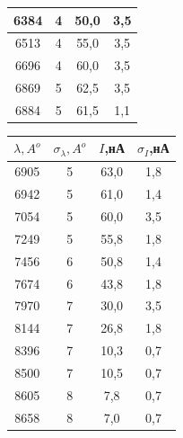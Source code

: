 \documentclass[a4paper,12pt]{report}
\begin{document}
\begin{table}[H]
\begin{center}
\begin{tabular}{|c|c|c|c|}
6384      & 4               & 50,0                        & 3,5                              \\ \hline
6513      & 4               & 55,0                        & 3,5                              \\ \hline
6696      & 4               & 60,0                        & 3,5                              \\ \hline
6869      & 5               & 62,5                        & 3,5                              \\ \hline
6884      & 5               & 61,5                        & 1,1                              \\ \hline
\end{tabular}
\hspace{1 cm}
\begin{tabular}{|c|c|c|c|}
\hline
$\lambda, A^{o}$ & $\sigma_{\lambda}, A^{o}$ & $I$,нА & $\sigma_{I}$,нА \\ \hline
6905      & 5               & 63,0                        & 1,8                              \\ \hline
6942      & 5               & 61,0                        & 1,4                              \\ \hline
7054      & 5               & 60,0                        & 3,5                              \\ \hline
7249      & 5               & 55,8                        & 1,8                              \\ \hline
7456      & 6               & 50,8                        & 1,4                              \\ \hline
7674      & 6               & 43,8                        & 1,8                              \\ \hline
7970      & 7               & 30,0                        & 3,5                              \\ \hline
8144      & 7               & 26,8                        & 1,8                              \\ \hline
8396      & 7               & 10,3                        & 0,7                              \\ \hline
8500      & 7               & 10,5                        & 0,7                              \\ \hline
8605      & 8               & 7,8                         & 0,7                              \\ \hline
8658      & 8               & 7,0                         & 0,7                              \\ \hline

\end{tabular}
\end{center}
\end{table}
\end{document}
